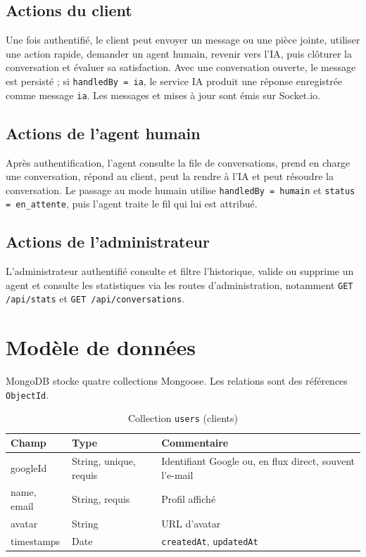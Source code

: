 \subsection{Actions du client}

Une fois authentifié, le client peut envoyer un message ou une pièce jointe, utiliser une action rapide, demander un agent humain, revenir vers l'IA, puis clôturer la conversation et évaluer sa satisfaction. Avec une conversation ouverte, le message est persisté ; si \texttt{handledBy = ia}, le service IA produit une réponse enregistrée comme message \texttt{ia}. Les messages et mises à jour sont émis sur Socket.io.

\subsection{Actions de l'agent humain}

Après authentification, l'agent consulte la file de conversations, prend en charge une conversation, répond au client, peut la rendre à l'IA et peut résoudre la conversation. Le passage au mode humain utilise \texttt{handledBy = humain} et \texttt{status = en\_attente}, puis l'agent traite le fil qui lui est attribué.

\subsection{Actions de l'administrateur}

L'administrateur authentifié consulte et filtre l'historique, valide ou supprime un agent et consulte les statistiques via les routes d'administration, notamment \texttt{GET /api/stats} et \texttt{GET /api/conversations}.

\section{Modèle de données}

MongoDB stocke quatre collections Mongoose. Les relations sont des références \texttt{ObjectId}.

\begin{table}[H]
\centering
\caption{Collection \texttt{users} (clients)}
\label{tab:user}
\begin{tabularx}{\textwidth}{|l|l|X|}
\hline
Champ & Type & Commentaire \\
\hline
googleId & String, unique, requis & Identifiant Google ou, en flux direct, souvent l'e-mail \\
\hline
name, email & String, requis & Profil affiché \\
\hline
avatar & String & URL d'avatar \\
\hline
timestamps & Date & \texttt{createdAt}, \texttt{updatedAt} \\
\hline
\end{tabularx}
\end{table}

